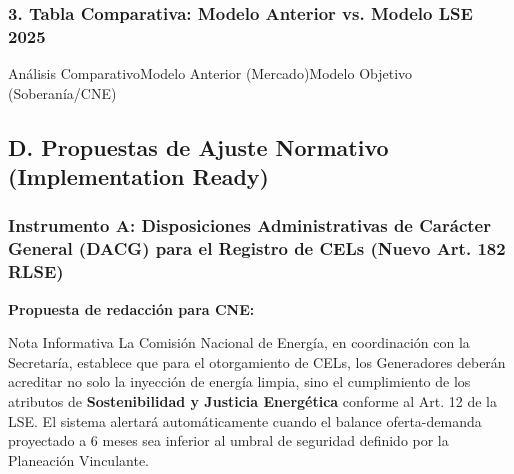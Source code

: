 \documentclass{cel}
\begin{document}
\subsubsection{3. Tabla Comparativa: Modelo Anterior vs. Modelo LSE 2025}
\nopagebreak

\vspace{0.3cm}
\begin{tablaParadigmaV2}{Análisis Comparativo}{Modelo Anterior (Mercado)}{Modelo Objetivo (Soberanía/CNE)}
\end{tablaParadigmaV2}


\subsection{D. Propuestas de Ajuste Normativo (Implementation Ready)}
\nopagebreak

\subsubsection{Instrumento A: Disposiciones Administrativas de Carácter General (DACG) para el Registro de CELs (Nuevo Art. 182 RLSE)}
\nopagebreak

\textbf{Propuesta de redacción para CNE:}


\vspace{0.2cm}
\begin{glowBox}[gobmxDorado]{Nota Informativa}
\textquotedbl{}La Comisión Nacional de Energía, en coordinación con la Secretaría, establece que para el otorgamiento de CELs, los Generadores deberán acreditar no solo la inyección de energía limpia, sino el cumplimiento de los atributos de \textbf{Sostenibilidad y Justicia Energética} conforme al Art. 12 de la LSE. El sistema alertará automáticamente cuando el balance oferta-demanda proyectado a 6 meses sea inferior al umbral de seguridad definido por la Planeación Vinculante.\textquotedbl{}
\end{glowBox}
\end{document}
